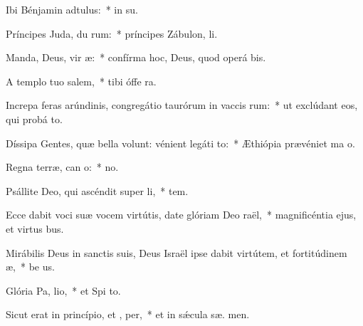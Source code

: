 \item Ibi Bénjamin adtulus:~* in  su.
\item Príncipes Juda, du rum:~* príncipes Zábulon,  li.
\item Manda, Deus, vir æ:~* confírma hoc, Deus, quod operá   bis.
\item A templo tuo  salem,~* tibi óffe  ra.
\item Increpa feras arúndinis, congregátio taurórum in vaccis rum:~* ut exclúdant eos, qui probá  to.
\item Díssipa Gentes, quæ bella volunt: vénient legáti  to:~* Æthiópia prævéniet ma  o.
\item Regna terræ, can o:~*  no.
\item Psállite Deo, qui ascéndit super  li,~*  tem.
\item Ecce dabit voci suæ vocem virtútis, date glóriam Deo  raël,~* magnificéntia ejus, et virtus   bus.
\item Mirábilis Deus in sanctis suis, Deus Israël ipse dabit virtútem, et fortitúdinem  æ,~* be us.
\item Glória Pa,  lio,~* et Spi to.
\item Sicut erat in princípio, et ,  per,~* et in sǽcula sæ. men.
